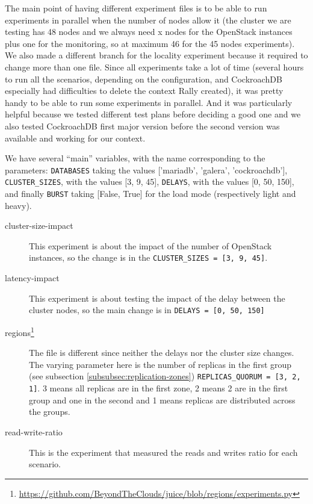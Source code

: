 The main point of having different experiment files is to be able to run experiments in parallel when the number of nodes allow it (the cluster we are testing has 48 nodes and we always need x nodes for the OpenStack instances plus one for the monitoring, so at maximum 46 for the 45 nodes experiments). We also made a different branch for the locality experiment because it required to change more than one file. Since all experiments take a lot of time (several hours to run all the scenarios, depending on the configuration, and CockroachDB especially had difficulties to delete the context Rally created), it was pretty handy to be able to run some experiments in parallel. And it was particularly helpful because we tested different test plans before deciding a good one and we also tested CockroachDB first major version before the second version was available and working for our context.

We have several ``main'' variables, with the name corresponding to the parameters: \verb+DATABASES+ taking the values ['mariadb', 'galera', 'cockroachdb'], \verb+CLUSTER_SIZES+, with the values [3, 9, 45], \verb+DELAYS+, with the values [0, 50, 150], and finally \verb+BURST+ taking [False, True] for the load mode (respectively light and heavy).

\begin{description}
\item[cluster-size-impact\footnotemark] This experiment is about the impact of the number of OpenStack instances, so the change is in the \verb+CLUSTER_SIZES = [3, 9, 45]+.
  \item[latency-impact\footnotemark] This experiment is about testing the impact of the delay between the cluster nodes, so the main change is in \verb+DELAYS = [0, 50, 150]+
\item[regions\footnote{\url{https://github.com/BeyondTheClouds/juice/blob/regions/experiments.py}}] The file is different since neither the delays nor the cluster size changes. The varying parameter here is the number of replicas in the first group (see subsection \ref{subsubsec:replication-zones}) \verb+REPLICAS_QUORUM = [3, 2, 1]+. 3 means all replicas are in the first zone, 2 means 2 are in the first group and one in the second and 1 means replicas are distributed across the groups.
  \item[read-write-ratio\footnotemark] This is the experiment that measured the reads and writes ratio for each scenario.
\end{description}
